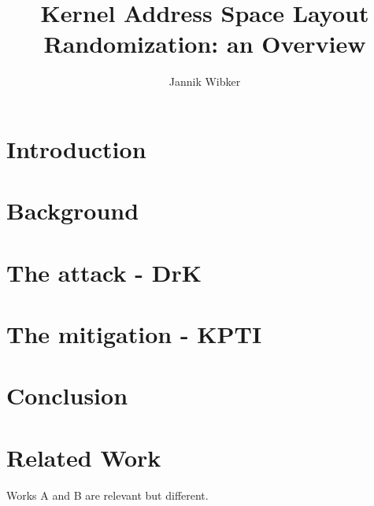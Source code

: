 \documentclass[10pt,twocolumn,a4paper]{article}
\author{Jannik Wibker}
\begin{document}
\title{ Kernel Address Space Layout Randomization: an Overview }

\newcommand{\todo}[1]{{\texttt{[#1]}}}
\newcommand{\code}[1]{{\tt \small{#1}}}

\maketitle

\begin{abstract}

\end{abstract}

\section{Introduction}\label{sec:introduction}



\section{Background}\label{sec:background}



\section{The attack - DrK}\label{sec:drk}



\section{The mitigation - KPTI}\label{sec:kpti}



\section{Conclusion}\label{sec:conclusion}



\section{Related Work}\label{sec:relwork}

Works A and B are relevant but different.



\end{document}
